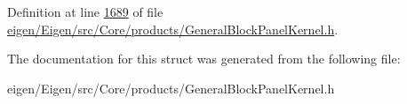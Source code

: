 Definition at line \hyperlink{eigen_2_eigen_2src_2_core_2products_2_general_block_panel_kernel_8h_source_l01689}{1689} of file \hyperlink{eigen_2_eigen_2src_2_core_2products_2_general_block_panel_kernel_8h_source}{eigen/\+Eigen/src/\+Core/products/\+General\+Block\+Panel\+Kernel.\+h}.



The documentation for this struct was generated from the following file\+:\begin{DoxyCompactItemize}
\item 
eigen/\+Eigen/src/\+Core/products/\+General\+Block\+Panel\+Kernel.\+h\end{DoxyCompactItemize}
